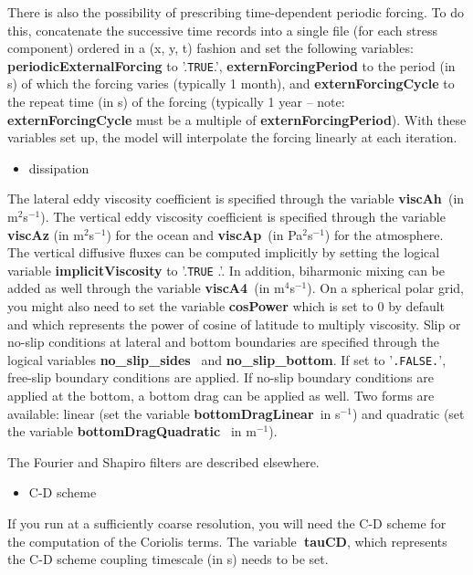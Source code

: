 There is also the possibility of prescribing time-dependent periodic
forcing. To do this, concatenate the successive time records into a single
file (for each stress component) ordered in a (x, y, t) fashion and set the
following variables: \textbf{periodicExternalForcing }to '.\texttt{TRUE}.', 
\textbf{externForcingPeriod }to the period (in s) of which the forcing
varies (typically 1 month), and \textbf{externForcingCycle }to the repeat
time (in s) of the forcing (typically 1 year -- note: \textbf{%
externForcingCycle }must be a multiple of \textbf{externForcingPeriod}).
With these variables set up, the model will interpolate the forcing linearly
at each iteration.

\begin{itemize}
\item dissipation
\end{itemize}

The lateral eddy viscosity coefficient is specified through the variable 
\textbf{viscAh}\textit{\ }(in m$^{2}$s$^{-1}$). The vertical eddy viscosity
coefficient is specified through the variable \textbf{viscAz }(in m$^{2}$s$%
^{-1}$) for the ocean and \textbf{viscAp}\textit{\ }(in Pa$^{2}$s$^{-1}$)
for the atmosphere. The vertical diffusive fluxes can be computed implicitly
by setting the logical variable \textbf{implicitViscosity }to '.\texttt{TRUE}%
.'. In addition, biharmonic mixing can be added as well through the variable 
\textbf{viscA4}\textit{\ }(in m$^{4}$s$^{-1}$). On a spherical polar grid,
you might also need to set the variable \textbf{cosPower} which is set to 0
by default and which represents the power of cosine of latitude to multiply
viscosity. Slip or no-slip conditions at lateral and bottom boundaries are
specified through the logical variables \textbf{no\_slip\_sides}\textit{\ }%
and \textbf{no\_slip\_bottom}. If set to '\texttt{.FALSE.}', free-slip
boundary conditions are applied. If no-slip boundary conditions are applied
at the bottom, a bottom drag can be applied as well. Two forms are
available: linear (set the variable \textbf{bottomDragLinear}\textit{\ }in s$%
^{-1}$) and quadratic (set the variable \textbf{bottomDragQuadratic}\textit{%
\ }in m$^{-1}$).

The Fourier and Shapiro filters are described elsewhere.

\begin{itemize}
\item C-D scheme
\end{itemize}

If you run at a sufficiently coarse resolution, you will need the C-D scheme
for the computation of the Coriolis terms. The variable\textbf{\ tauCD},
which represents the C-D scheme coupling timescale (in s) needs to be set.

